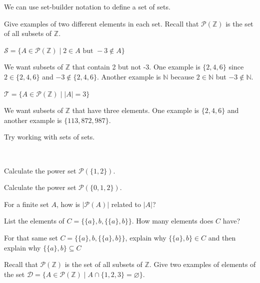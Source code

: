 We can use set-builder notation to define a set of sets.

\begin{exam}
\label{exam_set_of_sets_setbuilder}
    Give examples of two different elements in each set.  Recall that $\mathscr{P}(\mathbb{Z})$ is the set of all subsets of $\mathbb{Z}$.
        \begin{apart}
            \item $\mathscr{S} = \{ A \in \mathscr{P}(\mathbb{Z}) \mid 2 \in A \text{ but }-3 \notin A\} $
                \begin{soln}
                    We want subsets of $\mathbb{Z}$ that contain 2 but not -3.  One example is $\{2,4,6\}$ since $2 \in \{2,4,6\}$ and $-3 \notin \{2,4,6\}$.   Another example is $\mathbb{N}$ because $2 \in \mathbb{N}$ but $-3 \notin \mathbb{N}$.
                \end{soln}
            \item $\mathscr{T} = \{A \in \mathscr{P}(\mathbb{Z}) \mid |A|=3\}$
                \begin{soln}
                    We want subsets of $\mathbb{Z}$ that have three elements.  One example is $\{2,4,6\}$ and another example is $\{113, 872, 987\}$.
                \end{soln}
        \end{apart}
\end{exam}

Try working with sets of sets.

\begin{act}
\label{act_sets_of_sets}
~
    \begin{actpart}
        \item Calculate the power set $\mathscr{P}(\{1,2\})$. 
        \item Calculate the power set $\mathscr{P}(\{0,1,2\})$. 
        \item For a finite set $A$, how is $|\mathscr{P}(A)|$ related to $|A|$?
        \item List the elements of $C=\{ \{a\},b,\{\{a\},b\}\}$.  How many elements does $C$ have?
        \item For that same set $C=\{ \{a\},b,\{\{a\},b\}\}$, explain why $\{\{a\},b\} \in C$ and then explain why $\{\{a\},b\} \subseteq C$
        \item Recall that $\mathscr{P}(\mathbb{Z})$ is the set of all subsets of $\mathbb{Z}$.  Give two examples of elements of the set $\mathscr{D} = \{ A \in \mathscr{P}(\mathbb{Z}) \mid A \cap \{1,2,3\} = \varnothing\}$.
    \end{actpart}
\end{act}


